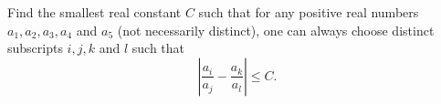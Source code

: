 Find the smallest real constant $C$ such that for any positive real numbers $a_1, a_2, a_3, a_4$ and $a_5$ (not necessarily distinct), one can always choose distinct subscripts $i, j, k$ and $l$ such that
\[
\left| \frac{a_i}{a_j} - \frac{a_k}{a_l} \right| \leq C.
\]
